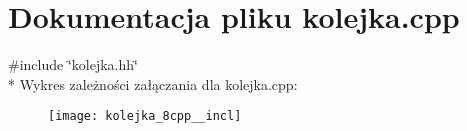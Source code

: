 \section{Dokumentacja pliku kolejka.\+cpp}
\label{kolejka_8cpp}
{\ttfamily \#include \char`\"{}kolejka.\+hh\char`\"{}}\\*
Wykres zależności załączania dla kolejka.\+cpp\+:\nopagebreak
\begin{figure}[H]
\begin{center}
\leavevmode
\texttt{[image: kolejka\_8cpp\_\_incl]}
\end{center}
\end{figure}
